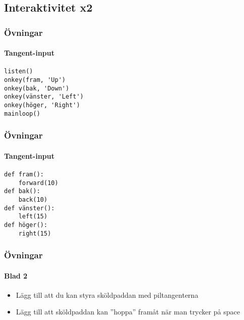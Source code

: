 \documentclass[aspectratio=169]{beamer}
\begin{document}
\subsection{Interaktivitet x2}

\begin{frame}[fragile]
	\frametitle{Övningar}
	\framesubtitle{Tangent-input}
	
	\begin{lstlisting}
listen()
onkey(fram, 'Up')
onkey(bak, 'Down')
onkey(vänster, 'Left')
onkey(höger, 'Right')
mainloop()
	\end{lstlisting}
	
\end{frame}

\begin{frame}[fragile]
	\frametitle{Övningar}
	\framesubtitle{Tangent-input}
	
	\begin{lstlisting}
def fram():
    forward(10)
def bak():
    back(10)
def vänster():
    left(15)
def höger():
    right(15)
	\end{lstlisting}
	
\end{frame}

\begin{frame}
	\frametitle{Övningar}
	\framesubtitle{Blad 2}
	
	\begin{itemize}
		\item Lägg till att du kan styra sköldpaddan med piltangenterna
		\item Lägg till att sköldpaddan kan ''hoppa'' framåt när man trycker på space
	\end{itemize}
	
\end{frame}
\end{document}
